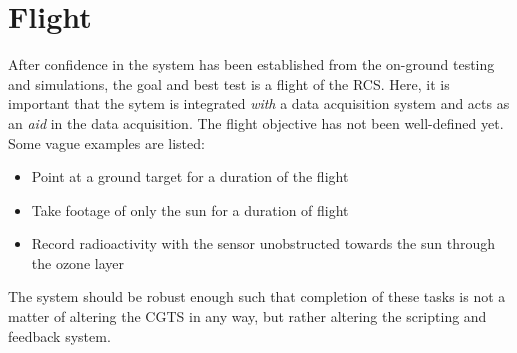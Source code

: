 \section{Flight}
After confidence in the system has been established from the on-ground testing and simulations, the goal and best test is a flight of the RCS. Here, it is important that the sytem is integrated \textit{with} a data acquisition system and acts as an \textit{aid} in the data acquisition. The flight objective has not been well-defined yet. Some vague examples are listed:
\begin{itemize}
\item Point at a ground target for a duration of the flight
\item Take footage of only the sun for a duration of flight
\item Record radioactivity with the sensor unobstructed towards the sun through the ozone layer
\end{itemize}
The system should be robust enough such that completion of these tasks is not a matter of altering the CGTS in any way, but rather altering the scripting and feedback system. 
